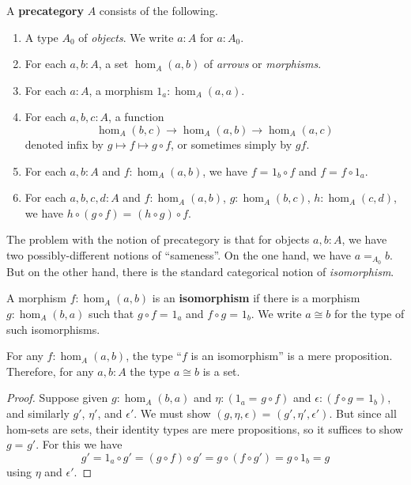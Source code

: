 \documentclass{amsart}
\newcommand{\id}[3][]{\ensuremath{#2 =_{#1} #3}\xspace}
\theoremstyle{definition}
\theoremstyle{remark}
\numberwithin{equation}{section}
\begin{document}
\begin{defn}\label{ct:precategory}
  A \textbf{precategory} $A$ consists of the following.
  \begin{enumerate}
  \item A type $A_0$ of \emph{objects}.  We write $a:A$ for $a:A_0$.
  \item For each $a,b:A$, a set $\hom_A(a,b)$ of \emph{arrows} or \emph{morphisms}.
  \item For each $a:A$, a morphism $1_a:\hom_A(a,a)$.
  \item For each $a,b,c:A$, a function
    \[  \hom_A(b,c) \to \hom_A(a,b) \to \hom_A(a,c) \]
    denoted infix by $g\mapsto f\mapsto g\circ f$, or sometimes simply by $gf$.
  \item For each $a,b:A$ and $f:\hom_A(a,b)$, we have $\id f {1_b\circ f}$ and $\id f {f\circ 1_a}$.
  \item For each $a,b,c,d:A$ and $f:\hom_A(a,b)$, $g:\hom_A(b,c)$, $h:\hom_A(c,d)$, we have $\id {h\circ (g\circ f)}{(h\circ g)\circ f}$.
  \end{enumerate}
\end{defn}

The problem with the notion of precategory is that for objects $a,b:A$, we have two possibly-different notions of ``sameness''.
On the one hand, we have $\id[A_0]{a}{b}$.
But on the other hand, there is the standard categorical notion of \emph{isomorphism}.

\begin{defn}\label{ct:isomorphism}
  A morphism $f:\hom_A(a,b)$ is an \textbf{isomorphism} if there is a morphism $g:\hom_A(b,a)$ such that $\id{g\circ f}{1_a}$ and $\id{f\circ g}{1_b}$.
  We write $a\cong b$ for the type of such isomorphisms.
\end{defn}

\begin{lem}\label{ct:isoprop}
  For any $f:\hom_A(a,b)$, the type ``$f$ is an isomorphism'' is a mere proposition.
  Therefore, for any $a,b:A$ the type $a\cong b$ is a set.
\end{lem}
\begin{proof}
  Suppose given $g:\hom_A(b,a)$ and $\eta:(\id{1_a}{g\circ f})$ and $\epsilon:(\id{f\circ g}{1_b})$, and similarly $g'$, $\eta'$, and $\epsilon'$.
We must show $\id{(g,\eta,\epsilon)}{(g',\eta',\epsilon')}$.
  But since all hom-sets are sets, their identity types are mere propositions, so it suffices to show $\id g {g'}$.
  For this we have
  \[g' = 1_a\circ g' = (g\circ f)\circ g' = g\circ (f\circ g') = g\circ 1_b = g\]
  using $\eta$ and $\epsilon'$.
\end{proof}
\end{document}
